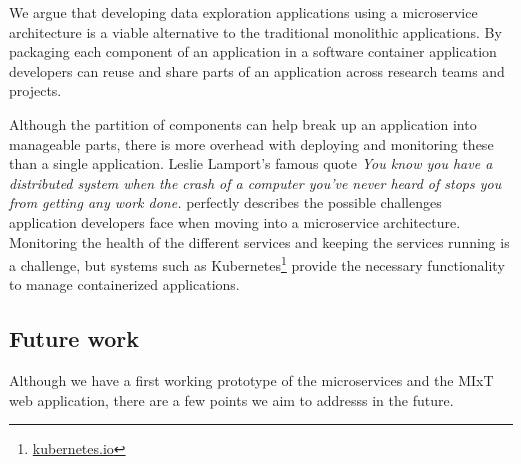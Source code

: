 


We argue that developing data exploration applications using a microservice
architecture is a viable alternative to the traditional monolithic applications.
By packaging each component of an application in a software container
application developers can reuse and share parts of an application across
research teams and projects. 

Although the partition of components can help break up an application into
manageable parts, there is more overhead with deploying and monitoring these
than a single application. Leslie Lamport's famous quote \emph{You know you have
a distributed system when the crash of a computer you’ve never heard of stops
you from getting any work done.} perfectly describes the possible challenges
application developers face when moving into a microservice architecture.
Monitoring the health of the different services and keeping the services running
is a challenge, but systems such as Kubernetes\footnote{\url{kubernetes.io}}
provide the necessary functionality to manage containerized applications. 




\subsection*{Future work} 
Although we have a first working prototype of the microservices and the MIxT web
application, there are a few points we aim to addresss in the future. 

